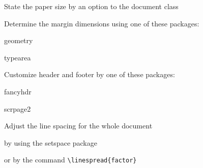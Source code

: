 \documentclass{article}
\begin{document}
\begin{compactenum}
\item State the paper size by an option to the document class
\item Determine the margin dimensions using one of these
  packages:
  \begin{compactitem}
  \item geometry
  \item typearea
  \end{compactitem}
\item Customize header and footer by one of these packages:
  \begin{compactitem}
  \item fancyhdr
  \item scrpage2
  \end{compactitem}
\item Adjust the line spacing for the whole document
  \begin{compactitem}
  \item by using the setspace package
  \item or by the command \verb|\linespread{factor}|
  \end{compactitem}
\end{compactenum}
\end{document}
